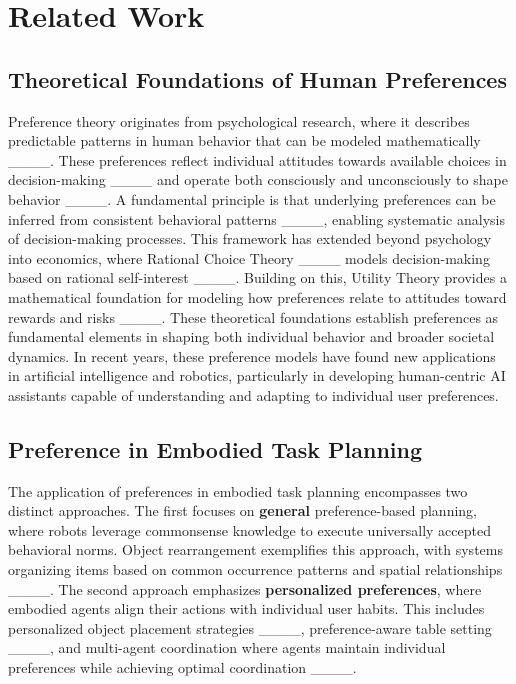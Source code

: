 \section{Related Work}
\subsection{Theoretical Foundations of Human Preferences}

Preference theory originates from psychological research, where it describes predictable patterns in human behavior that can be modeled mathematically ____. These preferences reflect individual attitudes towards available choices in decision-making ____ and operate both consciously and unconsciously to shape behavior ____. A fundamental principle is that underlying preferences can be inferred from consistent behavioral patterns ____, enabling systematic analysis of decision-making processes. This framework has extended beyond psychology into economics, where Rational Choice Theory ____ models decision-making based on rational self-interest ____. Building on this, Utility Theory provides a mathematical foundation for modeling how preferences relate to attitudes toward rewards and risks ____. These theoretical foundations establish preferences as fundamental elements in shaping both individual behavior and broader societal dynamics. In recent years, these preference models have found new applications in artificial intelligence and robotics, particularly in developing human-centric AI assistants capable of understanding and adapting to individual user preferences.

\subsection{Preference in Embodied Task Planning}

The application of preferences in embodied task planning encompasses two distinct approaches. The first focuses on \textbf{general} preference-based planning, where robots leverage commonsense knowledge to execute universally accepted behavioral norms. Object rearrangement exemplifies this approach, with systems organizing items based on common occurrence patterns and spatial relationships ____. The second approach emphasizes \textbf{personalized preferences}, where embodied agents align their actions with individual user habits. This includes personalized object placement strategies ____, preference-aware table setting ____, and multi-agent coordination where agents maintain individual preferences while achieving optimal coordination ____.

